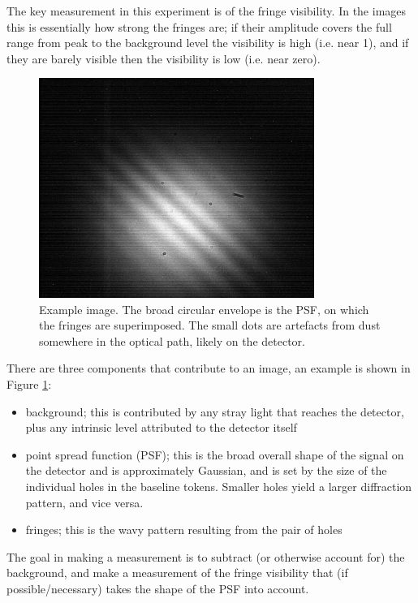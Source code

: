 \documentclass[11pt]{article}
\begin{document}
The key measurement in this experiment is of the fringe visibility. In the images this is essentially how strong the fringes are; if their amplitude covers the full range from peak to the background level the visibility is high (i.e. near 1), and if they are barely visible then the visibility is low (i.e. near zero).

\begin{figure}[h]
    \centering
    \includegraphics[width=0.8\textwidth]{doc/det-img.png}
    \caption{Example image. The broad circular envelope is the PSF, on which the fringes are superimposed. The small dots are artefacts from dust somewhere in the optical path, likely on the detector.}
    \label{fig:det-img}
\end{figure}

There are three components that contribute to an image, an example is shown in Figure \ref{fig:det-img}:
\begin{itemize}
    \item background; this is contributed by any stray light that reaches the detector, plus any intrinsic level attributed to the detector itself
    \item point spread function (PSF); this is the broad overall shape of the signal on the detector and is approximately Gaussian, and is set by the size of the individual holes in the baseline tokens. Smaller holes yield a larger diffraction pattern, and vice versa.
    \item fringes; this is the wavy pattern resulting from the pair of holes
\end{itemize}
The goal in making a measurement is to subtract (or otherwise account for) the background, and make a measurement of the fringe visibility that (if possible/necessary) takes the shape of the PSF into account.
\end{document}
